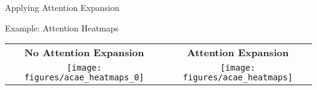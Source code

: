 \documentclass[10pt]{beamer}
\newcommand{\tabimg}[2]{\begin{tabular}{c}\texttt{[image: \#1]}\end{tabular}}
\begin{document}
%
%
%
%
%

%
%
%

\begin{frame}{Applying Attention Expansion}


\begin{exampleblock}{Example: Attention Heatmaps \cite{grad_cam}}
\begin{tabular}{c | c}
\textbf{No Attention Expansion} & \textbf{Attention Expansion}\\
\texttt{[image: figures/acae\_heatmaps\_0]} & \texttt{[image: figures/acae\_heatmaps]}
\end{tabular}
\end{exampleblock}
\end{frame}
\end{document}
